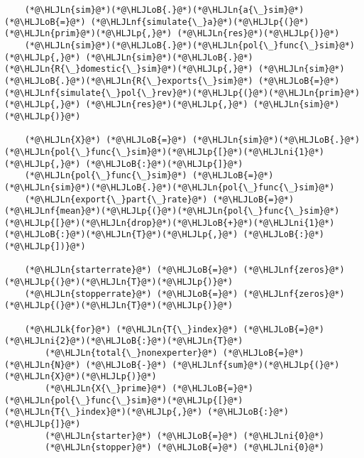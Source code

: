 \documentclass[12pt,a4paper]{article}
\newcommand{\HLJLk}[1]{\textcolor[RGB]{148,91,176}{\textbf{#1}}}
\newcommand{\HLJLn}[1]{#1}
\newcommand{\HLJLnf}[1]{\textcolor[RGB]{66,102,213}{#1}}
\newcommand{\HLJLni}[1]{\textcolor[RGB]{59,151,46}{#1}}
\newcommand{\HLJLoB}[1]{\textcolor[RGB]{102,102,102}{\textbf{#1}}}
\newcommand{\HLJLp}[1]{#1}
\begin{document}
\begin{lstlisting}
    (*@\HLJLn{sim}@*)(*@\HLJLoB{.}@*)(*@\HLJLn{a{\_}sim}@*) (*@\HLJLoB{=}@*) (*@\HLJLnf{simulate{\_}a}@*)(*@\HLJLp{(}@*)(*@\HLJLn{prim}@*)(*@\HLJLp{,}@*) (*@\HLJLn{res}@*)(*@\HLJLp{)}@*)
    (*@\HLJLn{sim}@*)(*@\HLJLoB{.}@*)(*@\HLJLn{pol{\_}func{\_}sim}@*)(*@\HLJLp{,}@*) (*@\HLJLn{sim}@*)(*@\HLJLoB{.}@*)(*@\HLJLn{R{\_}domestic{\_}sim}@*)(*@\HLJLp{,}@*) (*@\HLJLn{sim}@*)(*@\HLJLoB{.}@*)(*@\HLJLn{R{\_}exports{\_}sim}@*) (*@\HLJLoB{=}@*) (*@\HLJLnf{simulate{\_}pol{\_}rev}@*)(*@\HLJLp{(}@*)(*@\HLJLn{prim}@*)(*@\HLJLp{,}@*) (*@\HLJLn{res}@*)(*@\HLJLp{,}@*) (*@\HLJLn{sim}@*)(*@\HLJLp{)}@*)

    (*@\HLJLn{X}@*) (*@\HLJLoB{=}@*) (*@\HLJLn{sim}@*)(*@\HLJLoB{.}@*)(*@\HLJLn{pol{\_}func{\_}sim}@*)(*@\HLJLp{[}@*)(*@\HLJLni{1}@*)(*@\HLJLp{,}@*) (*@\HLJLoB{:}@*)(*@\HLJLp{]}@*)
    (*@\HLJLn{pol{\_}func{\_}sim}@*) (*@\HLJLoB{=}@*) (*@\HLJLn{sim}@*)(*@\HLJLoB{.}@*)(*@\HLJLn{pol{\_}func{\_}sim}@*)
    (*@\HLJLn{export{\_}part{\_}rate}@*) (*@\HLJLoB{=}@*) (*@\HLJLnf{mean}@*)(*@\HLJLp{(}@*)(*@\HLJLn{pol{\_}func{\_}sim}@*)(*@\HLJLp{[}@*)(*@\HLJLn{drop}@*)(*@\HLJLoB{+}@*)(*@\HLJLni{1}@*)(*@\HLJLoB{:}@*)(*@\HLJLn{T}@*)(*@\HLJLp{,}@*) (*@\HLJLoB{:}@*)(*@\HLJLp{])}@*)

    (*@\HLJLn{starterrate}@*) (*@\HLJLoB{=}@*) (*@\HLJLnf{zeros}@*)(*@\HLJLp{(}@*)(*@\HLJLn{T}@*)(*@\HLJLp{)}@*)
    (*@\HLJLn{stopperrate}@*) (*@\HLJLoB{=}@*) (*@\HLJLnf{zeros}@*)(*@\HLJLp{(}@*)(*@\HLJLn{T}@*)(*@\HLJLp{)}@*)

    (*@\HLJLk{for}@*) (*@\HLJLn{T{\_}index}@*) (*@\HLJLoB{=}@*) (*@\HLJLni{2}@*)(*@\HLJLoB{:}@*)(*@\HLJLn{T}@*)
        (*@\HLJLn{total{\_}nonexperter}@*) (*@\HLJLoB{=}@*) (*@\HLJLn{N}@*) (*@\HLJLoB{-}@*) (*@\HLJLnf{sum}@*)(*@\HLJLp{(}@*)(*@\HLJLn{X}@*)(*@\HLJLp{)}@*)
        (*@\HLJLn{X{\_}prime}@*) (*@\HLJLoB{=}@*) (*@\HLJLn{pol{\_}func{\_}sim}@*)(*@\HLJLp{[}@*)(*@\HLJLn{T{\_}index}@*)(*@\HLJLp{,}@*) (*@\HLJLoB{:}@*)(*@\HLJLp{]}@*)
        (*@\HLJLn{starter}@*) (*@\HLJLoB{=}@*) (*@\HLJLni{0}@*)
        (*@\HLJLn{stopper}@*) (*@\HLJLoB{=}@*) (*@\HLJLni{0}@*)


\end{lstlisting}
\end{document}
